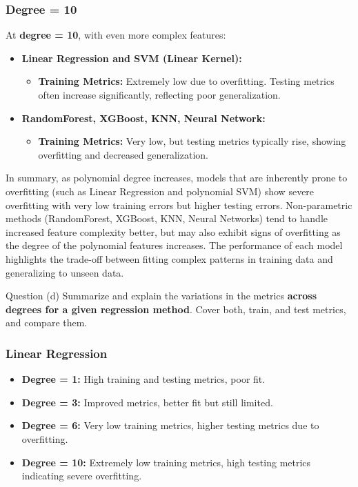 \subsubsection*{Degree = 10}

At \textbf{degree = 10}, with even more complex features:

\begin{itemize}
    \item \textbf{Linear Regression and SVM (Linear Kernel):} 
    \begin{itemize}
        \item \textbf{Training Metrics:} Extremely low due to overfitting. Testing metrics often increase significantly, reflecting poor generalization.
    \end{itemize}
    
    \item \textbf{RandomForest, XGBoost, KNN, Neural Network:}
    \begin{itemize}
        \item \textbf{Training Metrics:} Very low, but testing metrics typically rise, showing overfitting and decreased generalization.
    \end{itemize}
\end{itemize}

In summary, as polynomial degree increases, models that are inherently prone to overfitting (such as Linear Regression and polynomial SVM) show severe overfitting with very low training errors but higher testing errors. Non-parametric methods (RandomForest, XGBoost, KNN, Neural Networks) tend to handle increased feature complexity better, but may also exhibit signs of overfitting as the degree of the polynomial features increases. The performance of each model highlights the trade-off between fitting complex patterns in training data and generalizing to unseen data.

\begin{customboxnew}[label={box:Q3d}]{Question (d)}
	Summarize and explain the variations in the metrics \textbf{across degrees for a given regression method}. Cover both, train, and test metrics, and compare them.
\end{customboxnew}

\subsubsection*{Linear Regression}

\begin{itemize}
    \item \textbf{Degree = 1:} High training and testing metrics, poor fit.
    \item \textbf{Degree = 3:} Improved metrics, better fit but still limited.
    \item \textbf{Degree = 6:} Very low training metrics, higher testing metrics due to overfitting.
    \item \textbf{Degree = 10:} Extremely low training metrics, high testing metrics indicating severe overfitting.
\end{itemize}

